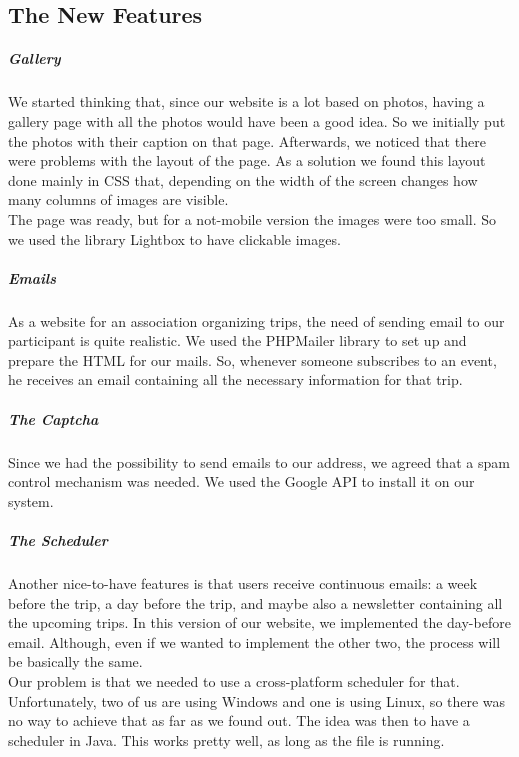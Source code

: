 \documentclass[a4paper]{article}
\begin{document}
	\subsection{The New Features}
	\subparagraph{Gallery}
	We started thinking that, since our website is a lot based on photos, having a gallery page with all the photos would have been a good idea. So we initially put the photos with their caption on that page. Afterwards, we noticed that there were problems with the layout of the page. As a solution we found this layout done mainly in CSS that, depending on the width of the screen changes how many columns of images are visible.\\
	The page was ready, but for a not-mobile version the images were too small. So we used the library Lightbox to have clickable images.
	\subparagraph{Emails}
	As a website for an association organizing trips, the need of sending email to our participant is quite realistic. We used the PHPMailer library to set up and prepare the HTML for our mails. So, whenever someone subscribes to an event, he receives an email containing all the necessary information for that trip.
	\subparagraph{The Captcha}
	Since we had the possibility to send emails to our address, we agreed that a spam control mechanism was needed. We used the Google API to install it on our system.
	\subparagraph{The Scheduler}
	Another nice-to-have features is that users receive continuous emails: a week before the trip, a day before the trip, and maybe also a newsletter containing all the upcoming trips. In this version of our website, we implemented the day-before email. Although, even if we wanted to implement the other two, the process will be basically the same.\\
	Our problem is that we needed to use a cross-platform scheduler for that. Unfortunately, two of us are using Windows and one is using Linux, so there was no way to achieve that as far as we found out. The idea was then to have a scheduler in Java. This works pretty well, as long as the file is running.
	
\end{document}
